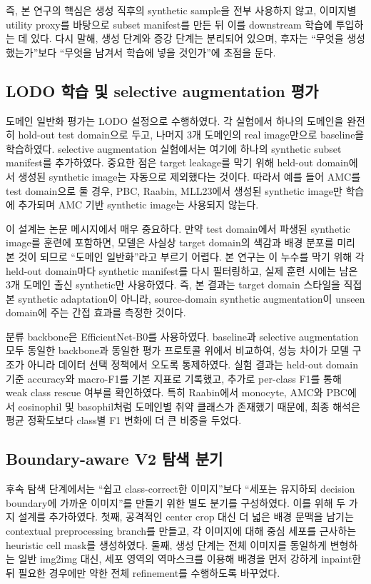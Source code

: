 \documentclass[11pt]{article}
\begin{document}
즉, 본 연구의 핵심은 생성 직후의 synthetic sample을 전부 사용하지 않고, 이미지별 utility proxy를 바탕으로 subset manifest를 만든 뒤 이를 downstream 학습에 투입하는 데 있다. 다시 말해, 생성 단계와 증강 단계는 분리되어 있으며, 후자는 ``무엇을 생성했는가''보다 ``무엇을 남겨서 학습에 넣을 것인가''에 초점을 둔다.

\subsection{LODO 학습 및 selective augmentation 평가}

도메인 일반화 평가는 LODO 설정으로 수행하였다. 각 실험에서 하나의 도메인을 완전히 hold-out test domain으로 두고, 나머지 3개 도메인의 real image만으로 baseline을 학습하였다. selective augmentation 실험에서는 여기에 하나의 synthetic subset manifest를 추가하였다. 중요한 점은 target leakage를 막기 위해 held-out domain에서 생성된 synthetic image는 자동으로 제외했다는 것이다. 따라서 예를 들어 AMC를 test domain으로 둘 경우, PBC, Raabin, MLL23에서 생성된 synthetic image만 학습에 추가되며 AMC 기반 synthetic image는 사용되지 않는다.

이 설계는 논문 메시지에서 매우 중요하다. 만약 test domain에서 파생된 synthetic image를 훈련에 포함하면, 모델은 사실상 target domain의 색감과 배경 분포를 미리 본 것이 되므로 ``도메인 일반화''라고 부르기 어렵다. 본 연구는 이 누수를 막기 위해 각 held-out domain마다 synthetic manifest를 다시 필터링하고, 실제 훈련 시에는 남은 3개 도메인 출신 synthetic만 사용하였다. 즉, 본 결과는 target domain 스타일을 직접 본 synthetic adaptation이 아니라, source-domain synthetic augmentation이 unseen domain에 주는 간접 효과를 측정한 것이다.

분류 backbone은 EfficientNet-B0를 사용하였다. baseline과 selective augmentation 모두 동일한 backbone과 동일한 평가 프로토콜 위에서 비교하여, 성능 차이가 모델 구조가 아니라 데이터 선택 정책에서 오도록 통제하였다. 실험 결과는 held-out domain 기준 accuracy와 macro-F1를 기본 지표로 기록했고, 추가로 per-class F1를 통해 weak class rescue 여부를 확인하였다. 특히 Raabin에서 monocyte, AMC와 PBC에서 eosinophil 및 basophil처럼 도메인별 취약 클래스가 존재했기 때문에, 최종 해석은 평균 정확도보다 class별 F1 변화에 더 큰 비중을 두었다.

\subsection{Boundary-aware V2 탐색 분기}

후속 탐색 단계에서는 ``쉽고 class-correct한 이미지''보다 ``세포는 유지하되 decision boundary에 가까운 이미지''를 만들기 위한 별도 분기를 구성하였다. 이를 위해 두 가지 설계를 추가하였다. 첫째, 공격적인 center crop 대신 더 넓은 배경 문맥을 남기는 contextual preprocessing branch를 만들고, 각 이미지에 대해 중심 세포를 근사하는 heuristic cell mask를 생성하였다. 둘째, 생성 단계는 전체 이미지를 동일하게 변형하는 일반 img2img 대신, 세포 영역의 역마스크를 이용해 배경을 먼저 강하게 inpaint한 뒤 필요한 경우에만 약한 전체 refinement를 수행하도록 바꾸었다.
\end{document}
